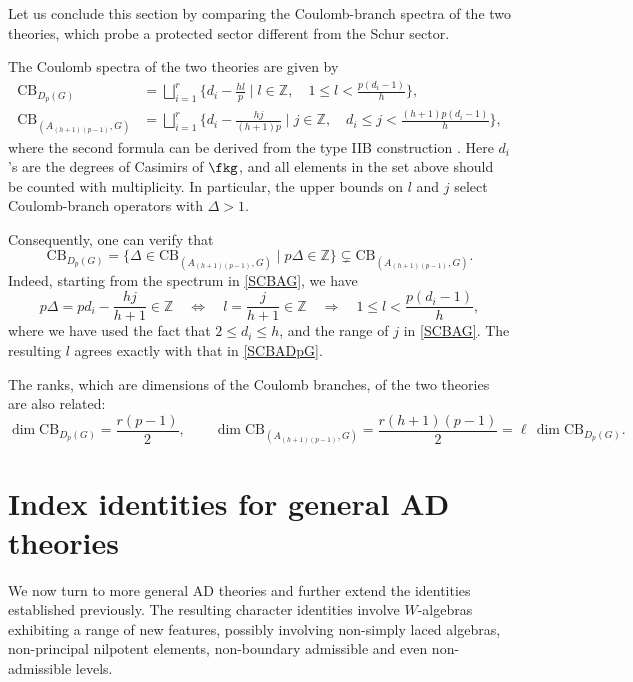 \documentclass[a4paper,11pt]{article}
\theoremstyle{definition}
\theoremstyle{definition}
\theoremstyle{remark}
\newcommand{\be}{\begin{equation}}
\newcommand{\ee}{\end{equation}}
\begin{document}
Let us conclude this section by comparing the Coulomb-branch spectra
of the two theories, which probe a protected sector different from
the Schur sector.

 
The Coulomb spectra of the two theories are given by   \cite{Cecotti:2013lda}
\begin{align}\label{SCBADpG}
 \text{CB}_{D_p(G)}
 &=\bigsqcup_{i=1}^{r}
 \Big\{
 d_i-\frac{hl}{p} \;\Big|\;
 l\in\mathbb Z,\quad
 1\le l<\frac{p(d_i-1)}h
 \Big\},\\ \label{SCBAG}
 \text{CB}_{(A_{(h+1)(p-1)},G)}
 &=\bigsqcup_{i=1}^{r}
 \Big\{
 d_i-\frac{hj}{(h+1)p}\;\Big|\;
 j\in\mathbb Z,\quad
 d_i\le j<\frac{(h+1)p(d_i-1)}h
 \Big\},
\end{align}
where the second formula can be derived from the type IIB construction \cite{Wang_2016}. Here  $d_i$'s are the degrees of Casimirs of $\fkg$, and all elements in the set above should be counted with multiplicity. In particular, the upper bounds on $l$ and $j$ select Coulomb-branch operators with         $\Delta>1$.

 Consequently, one can verify that  
\be
 \text{CB}_{D_p(G)}
 =
 \Big\{
 \Delta\in \text{CB}_{(A_{(h+1)(p-1)},G)}\;\Big|\;
 p\Delta\in\mathbb Z
 \Big\}
 \subsetneq
 \text{CB}_{(A_{(h+1)(p-1)},G)}.
\ee
Indeed, starting from the spectrum in \eqref{SCBAG}, we have
\be
 p\Delta=pd_i-\frac{hj}{h+1}\in\mathbb Z
 \quad\Longleftrightarrow\quad
 l=\frac{j}{ h+1} \in\mathbb Z
  \quad\Longrightarrow\quad
  1\le l<\frac{p(d_i-1)}{h},
\ee
where we have used the fact that  $2\le d_i\le h$, and the range of $j$ in \eqref{SCBAG}. The resulting $l$ agrees exactly with that in \eqref{SCBADpG}. 
 
 
The ranks, which are dimensions of the Coulomb branches, of the two theories are also related: 
\be 
\dim \text{CB}_{D_p(G)} 
  =\frac{r(p-1)}2, \qquad
\dim \text{CB}_{(A_{(h+1)(p-1)},G)} =\frac{r(h+1)(p-1)}2
 =\ell\, \dim  \text{CB}_{D_p(G)} .
 \ee
 
 
\section{Index identities for  general AD theories  }
\label{gwsecgeneral}
We now turn to more general AD theories and further extend the identities established previously. The resulting character identities involve $W$-algebras exhibiting a range of new features, possibly involving  non-simply laced algebras, non-principal nilpotent elements, non-boundary admissible  and even non-admissible levels.
 
\end{document}
